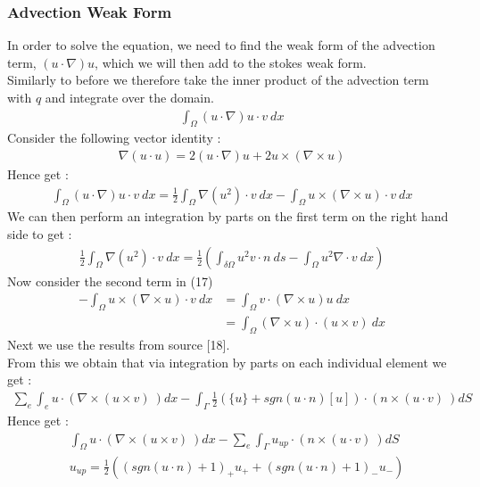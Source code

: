 \documentclass[11pt,twoside,a4paper]{article}
\begin{document}
\subsubsection{Advection Weak Form}
In order to solve the equation, we need to find the weak form of the advection term, $(u \cdot \nabla) u$, which we will then add to the stokes weak form.\\
Similarly to before we therefore take the inner product of the advection term with $q$ and integrate over the domain.
\begin{align}
\int_\Omega (u \cdot \nabla)u \cdot v \ dx
\end{align}
Consider the following vector identity :
\begin{align*}
\nabla (u \cdot u) = 2 (u \cdot \nabla) u + 2 u \times (\nabla \times u)
\end{align*}
Hence get :
\begin{align}
\int_\Omega (u \cdot \nabla)u \cdot v \ dx = \frac{1}{2} \int_\Omega \nabla (u^2) \cdot v \ dx - \int_{\Omega} u \times (\nabla \times u) \cdot v \ dx
\end{align}
We can then perform an integration by parts on the first term on the right hand side to get :
\begin{align}
 \frac{1}{2} \int_\Omega \nabla (u^2) \cdot v \ dx = \frac{1}{2} (\int_{\delta \Omega } u^2 v \cdot n \ ds - \int_\Omega u^2 \nabla \cdot v \ dx)
\end{align}
Now consider the second term in (17)
\begin{align*}
- \int_{\Omega} u \times (\nabla \times u) \cdot v \ dx &= \int_{\Omega} v \cdot (\nabla \times u) u \ dx   \\
&=  \int_{\Omega} (\nabla \times u) \cdot (u \times v)  \ dx
\end{align*}
Next we use the results from source [18].\\
From this we obtain that via integration by parts on each individual element we get :
\begin{align*}
\sum_e \int_e u \cdot (\nabla \times (u \times v) \ ) dx - \int_{\Gamma} \frac{1}{2}(\{u\} + sgn(u \cdot n)[u]) \cdot (n \times (u \cdot v) \ ) dS
\end{align*}
Hence get :
\begin{align}
&\int_\Omega u \cdot (\nabla \times (u \times v) \ ) dx -  \sum_e \int_{\Gamma} u_{up} \cdot (n \times (u \cdot v) \ ) dS \\
& u_{up} = \frac{1}{2}((sgn(u \cdot n) + 1)_+ u_+ + (sgn (u \cdot n) +1)_- u_-)
\end{align}
\end{document}
